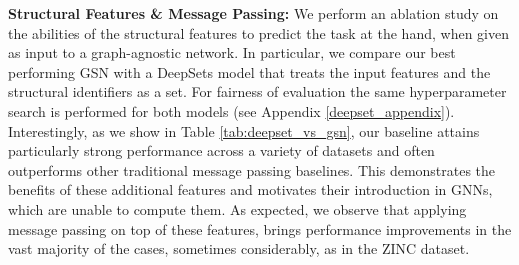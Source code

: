 \documentclass{article} \usepackage{iclr2021_conference,times}
\begin{document}
\noindent\textbf{Structural Features \& Message Passing:} We perform an ablation study on the abilities of the structural features to predict the task at the hand, when given as input to a graph-agnostic network. In particular, we compare our best performing GSN with a DeepSets model \citep{zaheer2017deep} that treats the input features and the structural identifiers as a set. For fairness of evaluation the same hyperparameter search is performed for both models (see Appendix \ref{deepset_appendix}). Interestingly, as we show in Table \ref{tab:deepset_vs_gsn}, our baseline attains particularly strong performance across a variety of datasets and often outperforms other traditional message passing baselines. This demonstrates the benefits of these additional features and motivates their introduction in GNNs, which are unable to compute them. As expected, we observe that applying message passing on top of these features, brings performance improvements in the vast majority of the cases, sometimes considerably, as in the ZINC dataset.



\begin{table}[h]
    \centering
\caption{Comparison between DeepSets and GSN with the same structural features}
\label{tab:deepset_vs_gsn}
\end{table}
\end{document}
